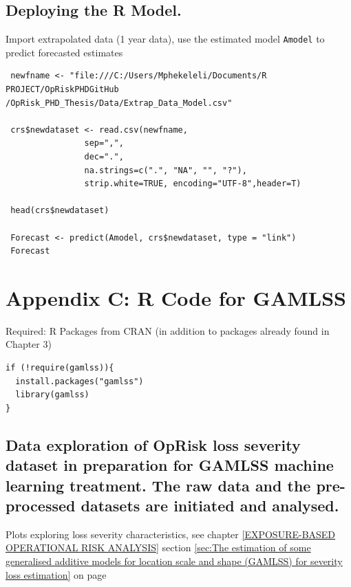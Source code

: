 \documentclass{DissertateUSU}
\begin{document}
\normalsize

\subsection{Deploying the R Model.}

Import extrapolated data (1 year data), use the estimated model
\texttt{Amodel} to predict forecasted estimates

\small

\begin{verbatim}
 newfname <- "file:///C:/Users/Mphekeleli/Documents/R PROJECT/OpRiskPHDGitHub
/OpRisk_PHD_Thesis/Data/Extrap_Data_Model.csv"

 crs$newdataset <- read.csv(newfname,
                sep=",",
                dec=".",
                na.strings=c(".", "NA", "", "?"),
                strip.white=TRUE, encoding="UTF-8",header=T)

 head(crs$newdataset)

 Forecast <- predict(Amodel, crs$newdataset, type = "link")
 Forecast
\end{verbatim}

\normalsize

\clearpage

\section{Appendix C: R Code for GAMLSS}
\label{sec:Appendix B: R Code for GAMLSS}

\singlespace

Required: R Packages from CRAN (in addition to packages already found in
Chapter 3)

\small

\begin{verbatim}
if (!require(gamlss)){
  install.packages("gamlss")
  library(gamlss)
}
\end{verbatim}

\normalsize

\subsection{Data exploration of OpRisk loss severity dataset in preparation for GAMLSS machine learning treatment. The raw data and the pre-processed datasets are initiated and analysed.}
\label{ssec:Data exploration GAMLSS}

Plots exploring loss severity characteristics, see chapter
\ref{EXPOSURE-BASED OPERATIONAL RISK ANALYSIS} section
\ref{sec:The estimation of some  generalised additive models for location scale and shape (GAMLSS) for severity loss estimation}
on page
\pageref{sec:The estimation of some  generalised additive models for location scale and shape (GAMLSS) for severity loss estimation}
\end{document}
